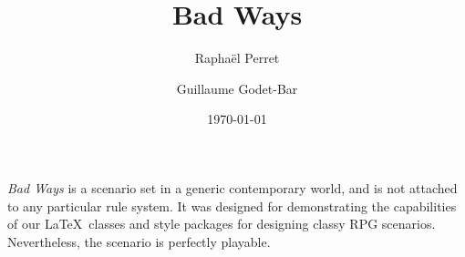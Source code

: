 \documentclass{/Users/raphaelperret/Documents/RPG-Manager/rpg_scenario}
\title{Bad Ways}
\date{\today}
\begin{document}
\author{Rapha\"el Perret \and Guillaume Godet-Bar}
\maketitle


\textit{Bad Ways} is a scenario set in a generic contemporary world, and is not
attached to any particular rule system. It was designed for demonstrating the
capabilities of our \LaTeX\ classes and style packages for designing classy RPG
scenarios. Nevertheless, the scenario is perfectly playable.




















\end{document}

